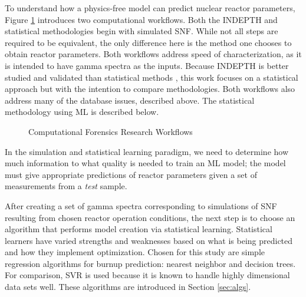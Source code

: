 To understand how a physics-free model can predict nuclear reactor parameters,
Figure \ref{fig:compworkflow} introduces two computational workflows. Both the
\gls{INDEPTH} and statistical methodologies begin with simulated \gls{SNF}.
While not all steps are required to be equivalent, the only difference here is
the method one chooses to obtain reactor parameters. Both workflows address
speed of characterization, as it is intended to have gamma spectra as the
inputs.  Because \gls{INDEPTH} is better studied and validated than statistical
methods \cite{weber_2006, weber_2011, weber_2010}, this work focuses on a
statistical approach but with the intention to compare methodologies.  Both
workflows also address many of the database issues, described above. The
statistical methodology using \gls{ML} is described below.
\\
\begin{figure}[!tbh]
  \caption{Computational Forensics Research Workflows}
  \label{fig:compworkflow}
\end{figure}

In the simulation and statistical learning paradigm, we need to determine how
much information to what quality is needed to train an \gls{ML} model;
the model must give appropriate predictions of reactor parameters given a set
of measurements from a \textit{test} sample. 

After creating a set of gamma spectra corresponding to simulations of \gls{SNF}
resulting from chosen reactor operation conditions, the next step is to choose
an algorithm that performs model creation via statistical learning.
Statistical learners have varied strengths and weaknesses based on what is
being predicted and how they implement optimization.  Chosen for this study are
simple regression algorithms for burnup prediction: nearest neighbor and
decision trees.  For comparison, \acrfull{SVR} is used because it is known to
handle highly dimensional data sets well.  These algorithms are introduced in
Section \ref{sec:algs}.

